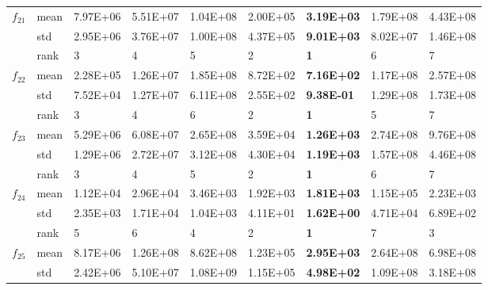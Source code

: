 \documentclass[a4paper,13pt,2p]{report}
\begin{document}
\begin{table}[!t]
\begin{tabular}{|l|l|l|l|l|l|l|l|l|}
\multirow{3}{*}{$f_{21}$} & mean & 7.97E+06 & 5.51E+07 & 1.04E+08 & 2.00E+05          & \textbf{3.19E+03}  & 1.79E+08 & 4.43E+08          \\ \cline{2-9} 
                     & std  & 2.95E+06 & 3.76E+07 & 1.00E+08 & 4.37E+05          & \textbf{9.01E+03}  & 8.02E+07 & 1.46E+08          \\ \cline{2-9} 
                     & rank & 3        & 4        & 5        & 2                 & \textbf{1}         & 6        & 7                 \\ \hline
\multirow{3}{*}{$f_{22}$} & mean & 2.28E+05 & 1.26E+07 & 1.85E+08 & 8.72E+02          & \textbf{7.16E+02}  & 1.17E+08 & 2.57E+08          \\ \cline{2-9} 
                     & std  & 7.52E+04 & 1.27E+07 & 6.11E+08 & 2.55E+02          & \textbf{9.38E-01}  & 1.29E+08 & 1.73E+08          \\ \cline{2-9} 
                     & rank & 3        & 4        & 6        & 2                 & \textbf{1}         & 5        & 7                 \\ \hline
\multirow{3}{*}{$f_{23}$} & mean & 5.29E+06 & 6.08E+07 & 2.65E+08 & 3.59E+04          & \textbf{1.26E+03}  & 2.74E+08 & 9.76E+08          \\ \cline{2-9} 
                     & std  & 1.29E+06 & 2.72E+07 & 3.12E+08 & 4.30E+04          & \textbf{1.19E+03}  & 1.57E+08 & 4.46E+08          \\ \cline{2-9} 
                     & rank & 3        & 4        & 5        & 2                 & \textbf{1}         & 6        & 7                 \\ \hline
                     \multirow{3}{*}{$f_{24}$} & mean & 1.12E+04 & 2.96E+04 & 3.46E+03 & 1.92E+03          & \textbf{1.81E+03}  & 1.15E+05 & 2.23E+03          \\ \cline{2-9} 
                     & std  & 2.35E+03 & 1.71E+04 & 1.04E+03 & 4.11E+01          & \textbf{1.62E+00}  & 4.71E+04 & 6.89E+02          \\ \cline{2-9} 
                     & rank & 5        & 6        & 4        & 2                 & \textbf{1}         & 7        & 3                 \\ \hline
\multirow{3}{*}{$f_{25}$} & mean & 8.17E+06 & 1.26E+08 & 8.62E+08 & 1.23E+05          & \textbf{2.95E+03}  & 2.64E+08 & 6.98E+08          \\ \cline{2-9} 
                     & std  & 2.42E+06 & 5.10E+07 & 1.08E+09 & 1.15E+05          & \textbf{4.98E+02}  & 1.09E+08 & 3.18E+08          \\ \cline{2-9} 

\end{tabular}
\end{table}
\end{document}

